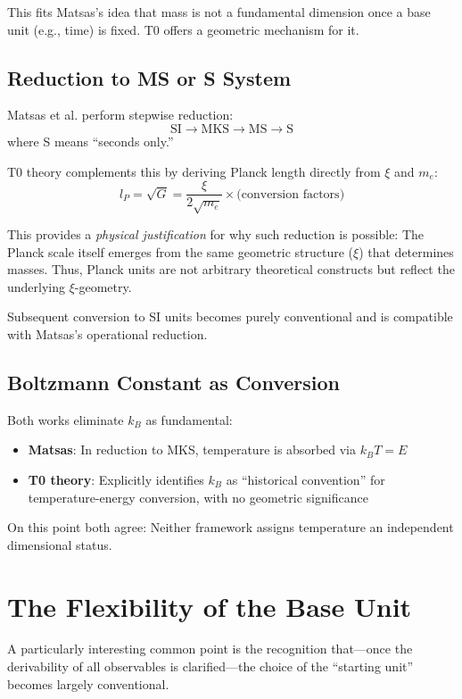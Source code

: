 	This fits Matsas's idea that mass is not a fundamental dimension once a base unit (e.g., time) is fixed. T0 offers a geometric mechanism for it.
	
	\subsection{Reduction to MS or S System}
	
	Matsas et al. perform stepwise reduction:
	\[
	\text{SI} \to \text{MKS} \to \text{MS} \to \text{S}
	\]
	where S means ``seconds only.''
	
	T0 theory complements this by deriving Planck length directly from $\xi$ and $m_e$:
	\[
	l_P = \sqrt{G} = \frac{\xi}{2\sqrt{m_e}} \times \text{(conversion factors)}
	\]
	
	This provides a \emph{physical justification} for why such reduction is possible: The Planck scale itself emerges from the same geometric structure ($\xi$) that determines masses. Thus, Planck units are not arbitrary theoretical constructs but reflect the underlying $\xi$-geometry.
	
	Subsequent conversion to SI units becomes purely conventional and is compatible with Matsas's operational reduction.
	
	\subsection{Boltzmann Constant as Conversion}
	
	Both works eliminate $k_B$ as fundamental:
	
	\begin{itemize}
		\item \textbf{Matsas}: In reduction to MKS, temperature is absorbed via $k_B T = E$
		\item \textbf{T0 theory}: Explicitly identifies $k_B$ as ``historical convention'' for temperature-energy conversion, with no geometric significance
	\end{itemize}
	
	On this point both agree: Neither framework assigns temperature an independent dimensional status.
	
	\section{The Flexibility of the Base Unit}
	
	A particularly interesting common point is the recognition that—once the derivability of all observables is clarified—the choice of the ``starting unit'' becomes largely conventional.
	
